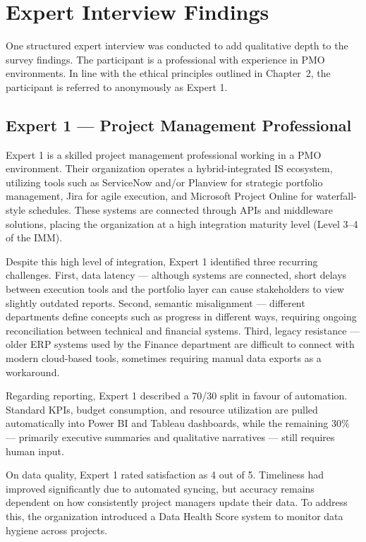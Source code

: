 \section{Expert Interview Findings}
\label{sec:interviews-findings}

One structured expert interview was conducted to add qualitative
depth to the survey findings. The participant is a professional
with experience in PMO environments. In line with the ethical
principles outlined in Chapter~2, the participant is referred
to anonymously as Expert 1.

\subsection{Expert 1 — Project Management Professional}

Expert 1 is a skilled project management professional working in a
PMO environment. Their organization operates a hybrid-integrated IS
ecosystem, utilizing tools such as ServiceNow and/or Planview for
strategic portfolio management, Jira for agile execution, and
Microsoft Project Online for waterfall-style schedules. These systems
are connected through APIs and middleware solutions, placing the
organization at a high integration maturity level (Level 3--4 of
the IMM).

Despite this high level of integration, Expert 1 identified three
recurring challenges. First, data latency — although systems are
connected, short delays between execution tools and the portfolio
layer can cause stakeholders to view slightly outdated reports.
Second, semantic misalignment — different departments define concepts
such as progress in different ways, requiring ongoing reconciliation
between technical and financial systems. Third, legacy resistance —
older ERP systems used by the Finance department are difficult to
connect with modern cloud-based tools, sometimes requiring manual
data exports as a workaround.

Regarding reporting, Expert 1 described a 70/30 split in favour of
automation. Standard KPIs, budget consumption, and resource
utilization are pulled automatically into Power BI and Tableau
dashboards, while the remaining 30\% — primarily executive summaries
and qualitative narratives — still requires human input.

On data quality, Expert 1 rated satisfaction as 4 out of 5.
Timeliness had improved significantly due to automated syncing,
but accuracy remains dependent on how consistently project managers
update their data. To address this, the organization introduced a
Data Health Score system to monitor data hygiene across projects.

